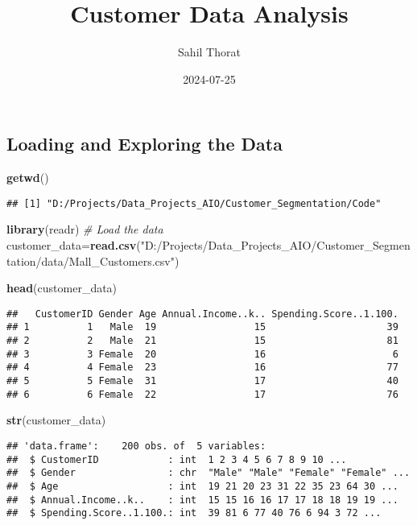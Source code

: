 \documentclass[
]{article}
\title{Customer Data Analysis}
\author{Sahil Thorat}
\date{2024-07-25}
\newenvironment{Shaded}{\begin{snugshade}}{\end{snugshade}}
\newcommand{\CommentTok}[1]{\textcolor[rgb]{0.56,0.35,0.01}{\textit{#1}}}
\newcommand{\FunctionTok}[1]{\textcolor[rgb]{0.13,0.29,0.53}{\textbf{#1}}}
\newcommand{\NormalTok}[1]{#1}
\newcommand{\OtherTok}[1]{\textcolor[rgb]{0.56,0.35,0.01}{#1}}
\newcommand{\StringTok}[1]{\textcolor[rgb]{0.31,0.60,0.02}{#1}}
\begin{document}
\maketitle

\subsection{Loading and Exploring the
Data}\label{loading-and-exploring-the-data}

\begin{Shaded}
\begin{Highlighting}[]
\FunctionTok{getwd}\NormalTok{()}
\end{Highlighting}
\end{Shaded}

\begin{verbatim}
## [1] "D:/Projects/Data_Projects_AIO/Customer_Segmentation/Code"
\end{verbatim}

\begin{Shaded}
\begin{Highlighting}[]
\FunctionTok{library}\NormalTok{(readr)}
\CommentTok{\# Load the data}
\NormalTok{customer\_data}\OtherTok{=}\FunctionTok{read.csv}\NormalTok{(}\StringTok{"D:/Projects/Data\_Projects\_AIO/Customer\_Segmentation/data/Mall\_Customers.csv"}\NormalTok{)}

\FunctionTok{head}\NormalTok{(customer\_data)}
\end{Highlighting}
\end{Shaded}

\begin{verbatim}
##   CustomerID Gender Age Annual.Income..k.. Spending.Score..1.100.
## 1          1   Male  19                 15                     39
## 2          2   Male  21                 15                     81
## 3          3 Female  20                 16                      6
## 4          4 Female  23                 16                     77
## 5          5 Female  31                 17                     40
## 6          6 Female  22                 17                     76
\end{verbatim}

\begin{Shaded}
\begin{Highlighting}[]
\FunctionTok{str}\NormalTok{(customer\_data)}
\end{Highlighting}
\end{Shaded}

\begin{verbatim}
## 'data.frame':    200 obs. of  5 variables:
##  $ CustomerID            : int  1 2 3 4 5 6 7 8 9 10 ...
##  $ Gender                : chr  "Male" "Male" "Female" "Female" ...
##  $ Age                   : int  19 21 20 23 31 22 35 23 64 30 ...
##  $ Annual.Income..k..    : int  15 15 16 16 17 17 18 18 19 19 ...
##  $ Spending.Score..1.100.: int  39 81 6 77 40 76 6 94 3 72 ...
\end{verbatim}
\end{document}
